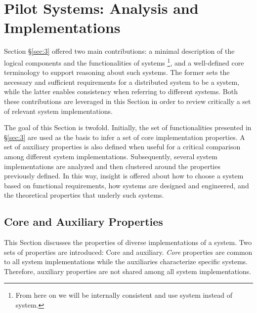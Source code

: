 \documentclass{sig-alternate}
\begin{document}

\section{Pilot Systems: Analysis and Implementations}
\label{sec:4}

Section \S\ref{sec:3} offered two main contributions: a minimal description of
the logical components and the functionalities of \pilot systems \footnote{
From here on we will be internally consistent and use \pilot system instead of
\pilotjob system.}, and a well-defined core terminology to support reasoning
about such systems.
The former sets the necessary and sufficient requirements for a distributed
system to be a \pilot system, while the latter enables consistency when
referring to different \pilot systems. Both these contributions are leveraged
in this Section in order to review critically a set of relevant \pilot system
implementations.

The goal of this Section is twofold.  Initially, the set of
functionalities presented in \S\ref{sec:3} are used as the basis
to infer a set of core implementation properties. A set of auxiliary
properties is also defined when useful for a critical comparison among
different \pilot system implementations. Subsequently, several \pilot system
implementations are analyzed and then clustered around the properties
previously defined. In this way, insight is offered about how to
choose a \pilot system based on functional requirements, how
\pilot systems are designed and engineered, and the theoretical
properties that underly such systems.

\subsection{Core and Auxiliary Properties}
\label{subsec:4.1}

This Section discusses the properties of diverse implementations of a \pilot
system. Two sets of properties are introduced: Core and auxiliary.
\textit{Core} properties are common to all \pilot system implementations while
the auxiliaries characterize specific \pilot systems. Therefore, auxiliary
properties are not shared among all \pilot system implementations.
\end{document}
